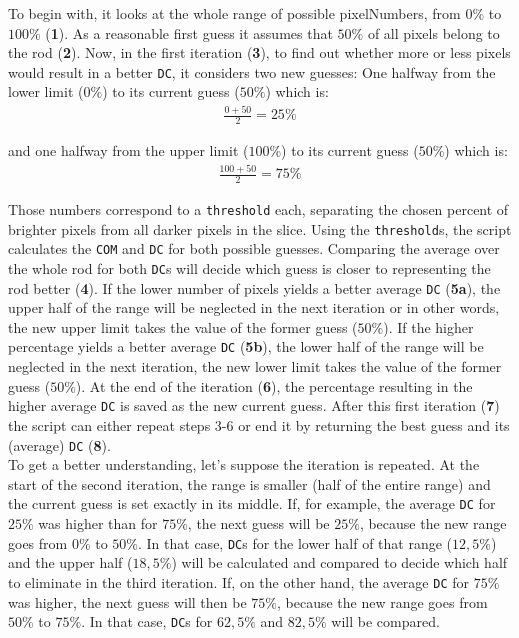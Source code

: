 To begin with, it looks at the whole range of possible pixelNumbers, from $0\%$ to $100\%$ (\textbf{1}).
As a reasonable first guess it assumes that $50\%$ of all pixels belong to the rod (\textbf{2}).
Now, in the first iteration (\textbf{3}), to find out whether more or less pixels would result in a better \texttt{DC}, it considers two new guesses:
One halfway from the lower limit ($0\%$) to its current guess ($50\%$) which is:
\begin{align}
 \frac{0+50}{2}=25\% 
\end{align}

and one halfway from the upper limit ($100\%$) to its current guess ($50\%$) which is:
\begin{align}
 \frac{100+50}{2}=75\%
\end{align}


Those numbers correspond to a \texttt{threshold} each, separating the chosen percent of brighter pixels from all darker pixels in the slice.
Using the \texttt{threshold}s, the script calculates the \texttt{COM} and \texttt{DC} for both possible guesses.
Comparing the average over the whole rod for both \texttt{DC}s will decide which guess is closer to representing the rod better (\textbf{4}).
If the lower number of pixels yields a better average \texttt{DC} (\textbf{5a}), the upper half of the range will be neglected in the next iteration or in other words, the new upper limit takes the value of the former guess ($50\%$).
If the higher percentage yields a better average \texttt{DC} (\textbf{5b}), the lower half of the range will be neglected in the next iteration, the new lower limit takes the value of the former guess ($50\%$).
At the end of the iteration (\textbf{6}), the percentage resulting in the higher average \texttt{DC} is saved as the new current guess.
After this first iteration (\textbf{7}) the script can either repeat steps 3-6 or end it by returning the best guess and its (average) \texttt{DC} (\textbf{8}).\\

To get a better understanding, let's suppose the iteration is repeated.
At the start of the second iteration, the range is smaller (half of the entire range) and the current guess is set exactly in its middle.
If, for example, the average \texttt{DC} for $25\%$ was higher than for $75\%$, the next guess will be $25\%$, because the new range goes from $0\%$ to $50\%$.
In that case, \texttt{DC}s for the lower half of that range ($12,5\%$) and the upper half ($18,5\%$) will be calculated and compared to decide which half to eliminate in the third iteration.
If, on the other hand, the average \texttt{DC} for $75\%$ was higher, the next guess will then be $75\%$, because the new range goes from $50\%$ to $75\%$.
In that case, \texttt{DC}s for $62,5\%$ and $82,5\%$ will be compared.

